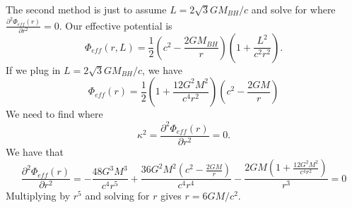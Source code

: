 \documentclass[]{article}
\begin{document}
The second method is just to assume $L = 2 \sqrt{3} G M_{BH}/c$ and solve for where $\frac{\partial^{2}\Phi_{eff}(r)}{\partial r^2} = 0$.
Our effective potential is
\begin{equation}
\Phi_{eff}(r,L) = \frac{1}{2}\left(c^2-\frac{2GM_{BH}}{r}\right)\left(1+ \frac{L^2}{c^2r^2}\right).
\end{equation}
\noindent
If we plug in $L=2\sqrt{3}GM_{BH}/c$, we have
\begin{equation}
\Phi_{eff}(r) = \frac{1}{2}\left(1+\frac{12G^2M^2}{c^4 r^2}\right)\left(c^2 - \frac{2GM}{r}\right)
\end{equation}
We need to find where
\begin{equation}
\kappa^2 = \frac{\partial^{2}\Phi_{eff}(r)}{\partial r^2} = 0.
\end{equation}
\noindent
We have that
\begin{equation}
\frac{\partial^{2}\Phi_{eff}(r)}{\partial r^2} = -\frac{48G^3 M^3}{c^4 r^5} + \frac{36 G^2 M^2 (c^2-\frac{2GM}{r})}{c^4 r^4} - \frac{2GM(1+\frac{12G^2M^2}{c^4r^2})}{r^3} = 0
\end{equation}
\noindent
Multiplying by $r^5$ and solving for $r$ gives $r = 6GM/c^2$.
\end{document}
